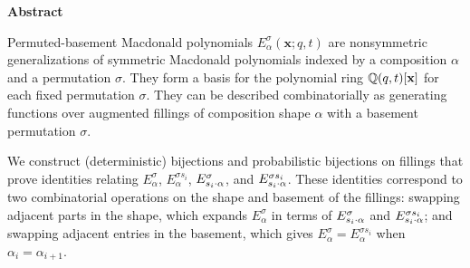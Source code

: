 {\large
{}
\begin{center}\textbf{Abstract}\end{center}

Permuted-basement Macdonald polynomials \(E_\alpha^\sigma(\mathbf{x};q,t)\) are nonsymmetric generalizations of symmetric Macdonald polynomials indexed by a composition \(\alpha\) and a permutation \(\sigma\).
They form a basis for the polynomial ring \(\mathbb{Q}(q,t)[\mathbf{x}]\) for each fixed permutation \(\sigma\).
They can be described combinatorially as generating functions over augmented fillings of composition shape \(\alpha\) with a basement permutation \(\sigma\).

We construct (deterministic) bijections and probabilistic bijections on fillings that
prove identities relating \(E_\alpha^\sigma\), \(E_\alpha^{\sigma s_i}\), \(E_{s_i \cdot \alpha}^\sigma\), and \(E_{s_i \cdot \alpha}^{\sigma s_i}\).
These identities correspond to two combinatorial operations on the shape and basement of the fillings:
swapping adjacent parts in the shape,
which expands \(E_\alpha^\sigma\) in terms of \(E_{s_i \cdot \alpha}^\sigma\) and \(E_{s_i \cdot \alpha}^{\sigma s_i}\);
and swapping adjacent entries in the basement,
which gives \(E_\alpha^\sigma = E_\alpha^{\sigma s_i}\) when \(\alpha_i = \alpha_{i+1}\).

}

\clearpage
{}


